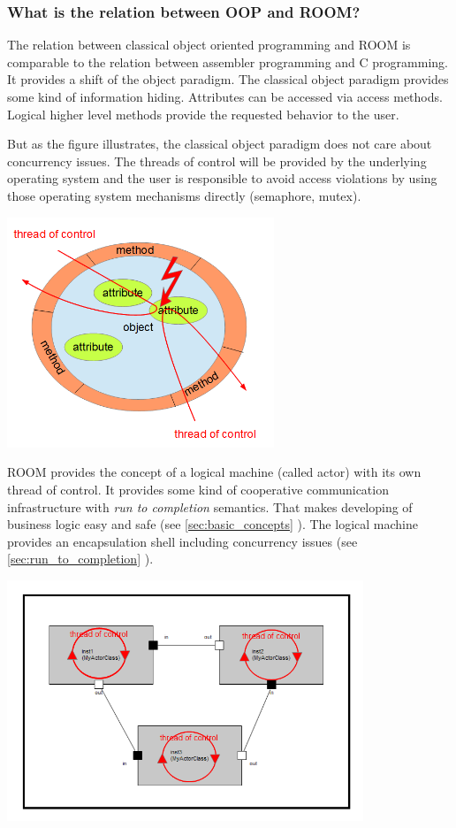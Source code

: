 \subsubsection*{What is the relation between OOP and ROOM?}

The relation between classical object oriented programming and ROOM is comparable to the relation between assembler
programming and C programming. It provides a shift of the object paradigm. The classical object
paradigm provides some kind of information hiding. Attributes can be accessed via access methods. Logical higher level
methods provide the requested behavior to the user.

But as the figure illustrates, the classical object paradigm does not care about concurrency issues. The threads of
control will be provided by the underlying operating system and the user is responsible to avoid access violations
by using those operating system mechanisms directly (semaphore, mutex).

\includegraphics[width=0.6\textwidth]{images/010-RoomIntroduction02.png}

ROOM provides the concept of a logical machine (called actor) with its own thread of control. It provides some kind
of cooperative communication infrastructure with \emph{run to completion} semantics.
That makes developing of business logic easy and safe (see \ref{sec:basic_concepts} ). The logical machine provides an 
encapsulation shell including concurrency issues (see \ref{sec:run_to_completion} ). 

\includegraphics[width=0.8\textwidth]{images/010-RoomIntroduction03.png}

